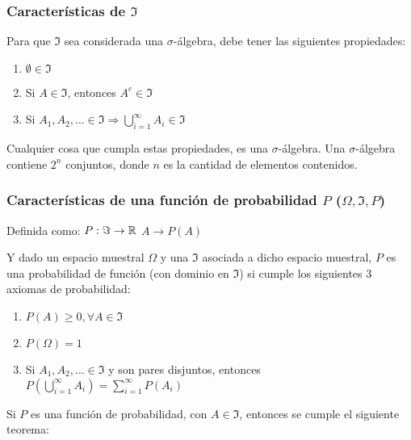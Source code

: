 \documentclass[]{article}
\providecommand{\tightlist}{%
  \setlength{\itemsep}{0pt}\setlength{\parskip}{0pt}}
\begin{document}
\subsubsection{\texorpdfstring{Características de
\(\Im\)}{Características de \textbackslash{}Im}}\label{caracteristicas-de-im}

Para que \(\Im\) sea considerada una \(\sigma\)-álgebra, debe tener las
siguientes propiedades:

\begin{enumerate}
\def\labelenumi{\arabic{enumi}.}
\tightlist
\item
  \(\emptyset \in \Im\)
\item
  Si \(A \in \Im\), entonces \(A^c \in \Im\)
\item
  Si
  \(A_1, A_2, ... \in \Im \Rightarrow \bigcup_{i=1}^\infty A_i \in \Im\)
\end{enumerate}

Cualquier cosa que cumpla estas propiedades, es una \(\sigma\)-álgebra.
Una \(\sigma\)-álgebra contiene \(2^n\) conjuntos, donde \(n\) es la
cantidad de elementos contenidos.

\subsubsection{\texorpdfstring{Características de una función de
probabilidad \(P\)
(\(\Omega, \Im, P\))}{Características de una función de probabilidad P (\textbackslash{}Omega, \textbackslash{}Im, P)}}\label{caracteristicas-de-una-funcion-de-probabilidad-p-omega-im-p}

Definida como: \(P: \Im \rightarrow \mathbb{R} \\\)
\(A \rightarrow P(A)\)

Y dado un espacio muestral \(\Omega\) y una \(\Im\) asociada a dicho
espacio muestral, \(P\) es una probabilidad de función (con dominio en
\(\Im\)) si cumple los siguientes 3 axiomas de probabilidad:

\begin{enumerate}
\def\labelenumi{\arabic{enumi}.}
\tightlist
\item
  \(P(A) \ge 0, \forall A \in \Im\)
\item
  \(P(\Omega) = 1\)
\item
  Si \(A_1, A_2, ... \in \Im\) y son pares disjuntos, entonces
  \(P(\bigcup_{i=1}^\infty A_i) = \sum_{i=1}^\infty P(A_i)\)
\end{enumerate}

Si \(P\) es una función de probabilidad, con \(A \in \Im\), entonces se
cumple el siguiente teorema:
\end{document}
